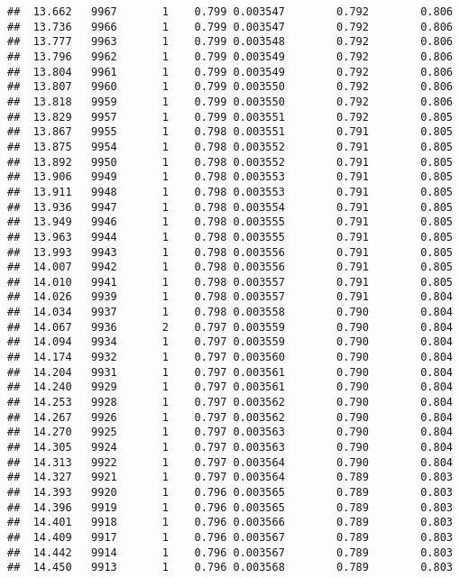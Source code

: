 \documentclass[
]{book}
\begin{document}
\begin{verbatim}
##  13.662   9967       1    0.799 0.003547        0.792        0.806
##  13.736   9966       1    0.799 0.003547        0.792        0.806
##  13.777   9963       1    0.799 0.003548        0.792        0.806
##  13.796   9962       1    0.799 0.003549        0.792        0.806
##  13.804   9961       1    0.799 0.003549        0.792        0.806
##  13.807   9960       1    0.799 0.003550        0.792        0.806
##  13.818   9959       1    0.799 0.003550        0.792        0.806
##  13.829   9957       1    0.799 0.003551        0.792        0.805
##  13.867   9955       1    0.798 0.003551        0.791        0.805
##  13.875   9954       1    0.798 0.003552        0.791        0.805
##  13.892   9950       1    0.798 0.003552        0.791        0.805
##  13.906   9949       1    0.798 0.003553        0.791        0.805
##  13.911   9948       1    0.798 0.003553        0.791        0.805
##  13.936   9947       1    0.798 0.003554        0.791        0.805
##  13.949   9946       1    0.798 0.003555        0.791        0.805
##  13.963   9944       1    0.798 0.003555        0.791        0.805
##  13.993   9943       1    0.798 0.003556        0.791        0.805
##  14.007   9942       1    0.798 0.003556        0.791        0.805
##  14.010   9941       1    0.798 0.003557        0.791        0.805
##  14.026   9939       1    0.798 0.003557        0.791        0.804
##  14.034   9937       1    0.798 0.003558        0.790        0.804
##  14.067   9936       2    0.797 0.003559        0.790        0.804
##  14.094   9934       1    0.797 0.003559        0.790        0.804
##  14.174   9932       1    0.797 0.003560        0.790        0.804
##  14.204   9931       1    0.797 0.003561        0.790        0.804
##  14.240   9929       1    0.797 0.003561        0.790        0.804
##  14.253   9928       1    0.797 0.003562        0.790        0.804
##  14.267   9926       1    0.797 0.003562        0.790        0.804
##  14.270   9925       1    0.797 0.003563        0.790        0.804
##  14.305   9924       1    0.797 0.003563        0.790        0.804
##  14.313   9922       1    0.797 0.003564        0.790        0.804
##  14.327   9921       1    0.797 0.003564        0.789        0.803
##  14.393   9920       1    0.796 0.003565        0.789        0.803
##  14.396   9919       1    0.796 0.003565        0.789        0.803
##  14.401   9918       1    0.796 0.003566        0.789        0.803
##  14.409   9917       1    0.796 0.003567        0.789        0.803
##  14.442   9914       1    0.796 0.003567        0.789        0.803
##  14.450   9913       1    0.796 0.003568        0.789        0.803

\end{verbatim}
\end{document}
